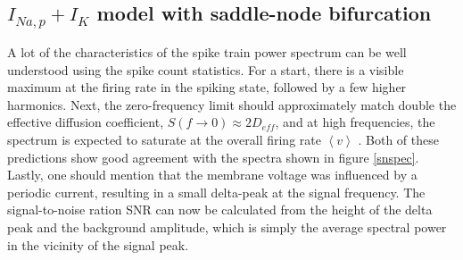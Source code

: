 \documentclass[12pt,a4paper]{article}
\begin{document}
\subsection{$I_{Na,p}+I_K$ model with saddle-node bifurcation}
A lot of the characteristics of the spike train power spectrum can be well understood using the spike count statistics. For a start, there is a visible maximum at the firing rate in the spiking state, followed by a few higher harmonics. Next, the zero-frequency limit should approximately match double the effective diffusion coefficient, $S(f\rightarrow0)\approx2D_{eff}$, and at high frequencies, the spectrum is expected to saturate at the overall firing rate $\left<v\right>$ \cite{speclim}\cite{speclim2}. Both of these predictions show good agreement with the spectra shown in figure \ref{snspec}. Lastly, one should mention that the membrane voltage was influenced by a periodic current, resulting in a small delta-peak at the signal frequency. The signal-to-noise ration SNR can now be calculated from the height of the delta peak and the background amplitude, which is simply the average spectral power in the vicinity of the signal peak.
\end{document}
